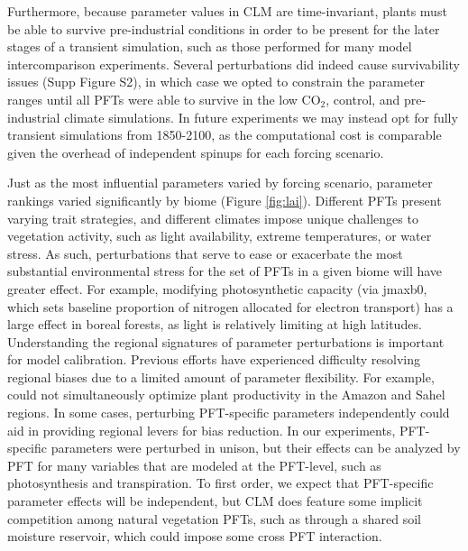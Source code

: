\documentclass[draft]{agujournal2019}
\begin{document}
Furthermore, because parameter values in CLM are time-invariant, plants must be able to survive pre-industrial conditions in order to be present for the later stages of a transient simulation, such as those performed for many model intercomparison experiments. Several perturbations did indeed cause survivability issues (Supp Figure S2), in which case we opted to constrain the parameter ranges until all PFTs were able to survive in the low CO$_2$, control, and pre-industrial climate simulations. In future experiments we may instead opt for fully transient simulations from 1850-2100, as the computational cost is comparable given the overhead of independent spinups for each forcing scenario.

Just as the most influential parameters varied by forcing scenario, parameter rankings varied significantly by biome (Figure \ref{fig:lai}). Different PFTs present varying trait strategies, and different climates impose unique challenges to vegetation activity, such as light availability, extreme temperatures, or water stress. As such, perturbations that serve to ease or exacerbate the most substantial environmental stress for the set of PFTs in a given biome will have greater effect. For example, modifying photosynthetic capacity (via jmaxb0, which sets baseline proportion of nitrogen allocated for electron transport) has a large effect in boreal forests, as light is relatively limiting at high latitudes.  Understanding the regional signatures of parameter perturbations is important for model calibration. Previous efforts have experienced difficulty resolving regional biases due to a limited amount of parameter flexibility. For example, \cite{dagon2020} could not simultaneously optimize plant productivity in the Amazon and Sahel regions. In some cases, perturbing PFT-specific parameters independently could aid in providing regional levers for bias reduction. In our experiments, PFT-specific parameters were perturbed in unison, but their effects can be analyzed by PFT for many variables that are modeled at the PFT-level, such as photosynthesis and transpiration. To first order, we expect that PFT-specific parameter effects will be independent, but CLM does feature some implicit competition among natural vegetation PFTs, such as through a shared soil moisture reservoir, which could impose some cross PFT interaction. 
\end{document}
